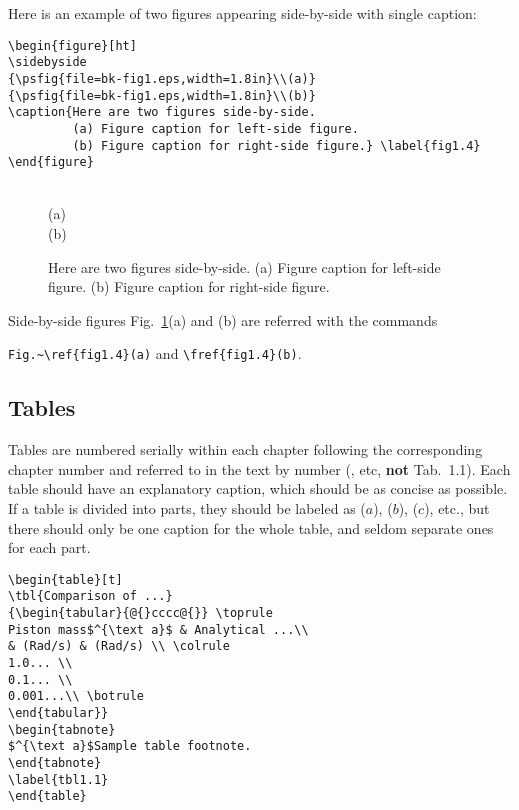 Here is an example of two figures appearing side-by-side with single caption:

\begin{verbatim}
\begin{figure}[ht]
\sidebyside
{\psfig{file=bk-fig1.eps,width=1.8in}\\(a)}
{\psfig{file=bk-fig1.eps,width=1.8in}\\(b)}
\caption{Here are two figures side-by-side.
         (a) Figure caption for left-side figure.
         (b) Figure caption for right-side figure.} \label{fig1.4}
\end{figure}
\end{verbatim}

\begin{figure}[ht]
\sidebyside
{
\\(a)
}
{
\\(b)
}
\caption{Here are two figures side-by-side.
         (a) Figure caption for left-side figure.
         (b) Figure caption for right-side figure.} \label{fig1.4}
\end{figure}

Side-by-side figures Fig.~\ref{fig1.4}(a) and (b) are
referred with the commands\par\noindent \verb|Fig.~\ref{fig1.4}(a)| and
\verb|\fref{fig1.4}(b)|.

\subsection{Tables}
Tables are numbered serially within each chapter following the
corresponding chapter number and referred to in the text by number
(, etc, {\bf not} Tab.~1.1). Each table should
have an explanatory caption, which should be as concise as possible.
If a table is divided into parts, they should be labeled as ($a$),
($b$), ($c$), etc., but there should only be one caption for the
whole table, and seldom separate ones for each part.

\begin{verbatim}
\begin{table}[t]
\tbl{Comparison of ...}
{\begin{tabular}{@{}cccc@{}} \toprule
Piston mass$^{\text a}$ & Analytical ...\\
& (Rad/s) & (Rad/s) \\ \colrule
1.0... \\
0.1... \\
0.001...\\ \botrule
\end{tabular}}
\begin{tabnote}
$^{\text a}$Sample table footnote.
\end{tabnote}
\label{tbl1.1}
\end{table}
\end{verbatim}


